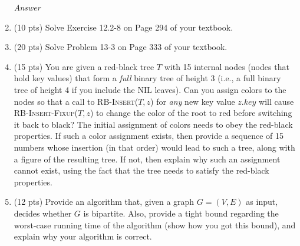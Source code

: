 \documentclass{article}
\begin{document}
\begin{enumerate}
\textit{Answer}


\newpage
 
\item (10 pts) Solve Exercise 12.2-8 on Page 294 of your textbook.

\item (20 pts) Solve Problem 13-3 on Page 333 of your textbook.

\item (15 pts) You are given a red-black tree $T$ with 15 internal nodes (nodes that hold key values) 
that form a \emph{full} binary tree of height 3 (i.e., a full binary tree of height 4 if you include 
the NIL leaves). Can you assign colors to the nodes so that a call to \textsc{RB-Insert}($T,z$) for
\emph{any} new key value $z.key$ will cause \textsc{RB-Insert-Fixup}($T,z$) to change the color of the 
root to red before switching it back to black? The initial assignment of colors needs to obey the 
red-black properties. If such a color assignment exists, then provide a sequence of 15 numbers whose 
insertion (in that order) would lead to such a tree, along with a figure of the resulting tree. If not, 
then explain why such an assignment cannot exist, using the fact that the tree needs to satisfy the 
red-black properties.

\item (12 pts) Provide an algorithm that, given a graph $G=(V,E)$ as input, decides whether $G$ is
bipartite. Also, provide a tight bound regarding the worst-case running time of the algorithm (show
how you got this bound), and explain why your algorithm is correct.


\end{enumerate}
\end{document}
